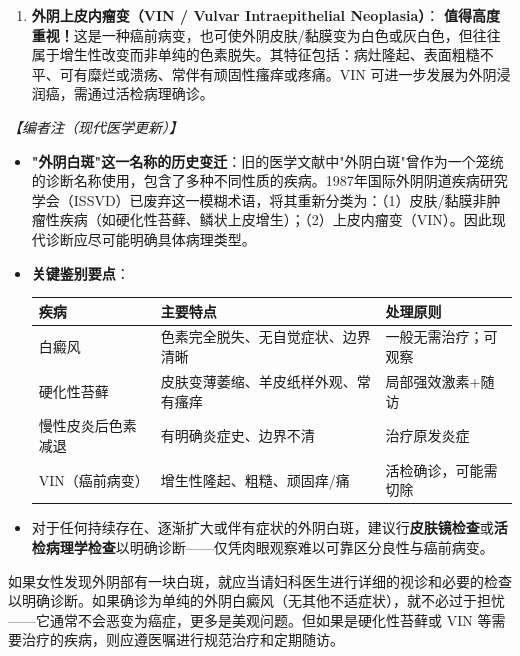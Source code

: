 \begin{enumerate}
\begin{enumerate}
	\item \textbf{外阴上皮内瘤变（VIN / Vulvar Intraepithelial Neoplasia）}：
	\textbf{值得高度重视！}这是一种癌前病变，也可使外阴皮肤/黏膜变为白色或灰白色，但往往属于增生性改变而非单纯的色素脱失。其特征包括：病灶隆起、表面粗糙不平、可有糜烂或溃疡、常伴有顽固性瘙痒或疼痛。VIN 可进一步发展为外阴浸润癌，需通过活检病理确诊。
\end{enumerate}

\noindent\textit{【编者注（现代医学更新）】}

\begin{itemize}
	\item \textbf{"外阴白斑"这一名称的历史变迁}：旧的医学文献中"外阴白斑"曾作为一个笼统的诊断名称使用，包含了多种不同性质的疾病。1987年国际外阴阴道疾病研究学会（ISSVD）已废弃这一模糊术语，将其重新分类为：（1）皮肤/黏膜非肿瘤性疾病（如硬化性苔藓、鳞状上皮增生）；（2）上皮内瘤变（VIN）。因此现代诊断应尽可能明确具体病理类型。
	\item \textbf{关键鉴别要点}：
	\begin{tabular}{p{3.5cm} p{4cm} p{4.5cm}}
	\toprule
	\textbf{疾病} & \textbf{主要特点} & \textbf{处理原则} \\
	\midrule
	白癜风 & 色素完全脱失、无自觉症状、边界清晰 & 一般无需治疗；可观察 \\
	硬化性苔藓 & 皮肤变薄萎缩、羊皮纸样外观、常有瘙痒 & 局部强效激素+随访 \\
	慢性皮炎后色素减退 & 有明确炎症史、边界不清 & 治疗原发炎症 \\
	VIN（癌前病变） & 增生性隆起、粗糙、顽固痒/痛 & 活检确诊，可能需切除 \\
	\bottomrule
	\end{tabular}

	\item 对于任何持续存在、逐渐扩大或伴有症状的外阴白斑，建议行\textbf{皮肤镜检查}或\textbf{活检病理学检查}以明确诊断——仅凭肉眼观察难以可靠区分良性与癌前病变。
\end{itemize}

\begin{tcolorbox}[colback=pink!5!white,colframe=red!50!black,title=贴心小叮咛]
如果女性发现外阴部有一块白斑，就应当请妇科医生进行详细的视诊和必要的检查以明确诊断。如果确诊为单纯的外阴白癜风（无其他不适症状），就不必过于担忧——它通常不会恶变为癌症，更多是美观问题。但如果是硬化性苔藓或 VIN 等需要治疗的疾病，则应遵医嘱进行规范治疗和定期随访。
\end{tcolorbox}


\end{enumerate}
